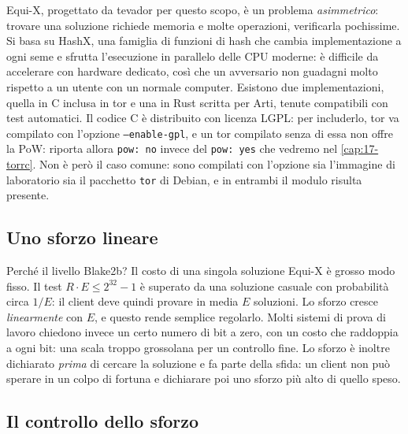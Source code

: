 \begin{approfondimento}
Equi-X, progettato da tevador per questo scopo, è un problema \emph{asimmetrico}: trovare una soluzione richiede memoria e molte operazioni, verificarla pochissime. Si basa su HashX, una famiglia di funzioni di hash che cambia implementazione a ogni seme e sfrutta l'esecuzione in parallelo delle CPU moderne: è difficile da accelerare con hardware dedicato, così che un avversario non guadagni molto rispetto a un utente con un normale computer. Esistono due implementazioni, quella in C inclusa in tor e una in Rust scritta per Arti, tenute compatibili con test automatici. Il codice C è distribuito con licenza LGPL: per includerlo, tor va compilato con l'opzione \texttt{--enable-gpl}, e un tor compilato senza di essa non offre la PoW:  riporta allora \texttt{pow: no} invece del \texttt{pow: yes} che vedremo nel \cref{cap:17-torrc}. Non è però il caso comune: sono compilati con l'opzione sia l'immagine di laboratorio sia il pacchetto \texttt{tor} di Debian, e in entrambi il modulo risulta presente.
\end{approfondimento}

\subsection{Uno sforzo lineare}

Perché il livello Blake2b? Il costo di una singola soluzione Equi-X è grosso modo fisso. Il test $R \cdot E \le 2^{32}-1$ è superato da una soluzione casuale con probabilità circa $1/E$: il client deve quindi provare in media $E$ soluzioni. Lo sforzo cresce \emph{linearmente} con $E$, e questo rende semplice regolarlo. Molti sistemi di prova di lavoro chiedono invece un certo numero di bit a zero, con un costo che raddoppia a ogni bit: una scala troppo grossolana per un controllo fine. Lo sforzo è inoltre dichiarato \emph{prima} di cercare la soluzione e fa parte della sfida: un client non può sperare in un colpo di fortuna e dichiarare poi uno sforzo più alto di quello speso.

\subsection{Il controllo dello sforzo}

